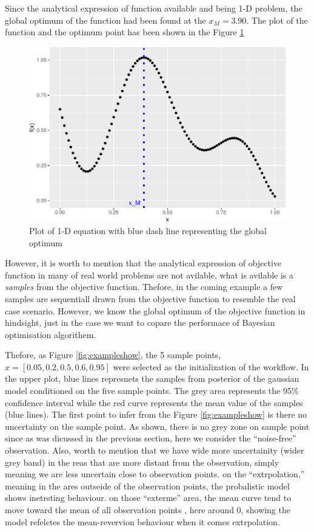 \documentclass[]{elsarticle} %
\begin{document}
Since the analytical expression of function available and being 1-D problem, the global optimum of the function had been found at the \(x_M = 3.90\). The plot of the function and the optimum point has been shown in the Figure \ref{fig:onedplot}

\begin{figure}

{\centering \includegraphics[width=0.9\linewidth]{0_Paper1_main_files/figure-latex/onedplot-1} 

}

\caption{Plot of 1-D equation with blue dash line representing the global optimum}\label{fig:onedplot}
\end{figure}

However, it is worth to mention that the analytical expression of objective function in many of real world problems are not avilable, what is avilable is a \emph{samples} from the objective function. Thefore, in the coming example a few samples are sequentiall drawn from the objective function to resemble the real case scenario. However, we know the global optimum of the objective function in hindsight, just in the case we want to copare the performace of Bayesian optimisation algorithem.

Thefore, as Figure \ref{fig:exampleshow}, the 5 sample points, \(x=[0.05,0.2,0.5,0.6,0.95]\) were selected as the initialization of the workflow. In the upper plot, blue lines represnets the samples from posterior of the gaussian model conditioned on the five sample points. The grey area represents the 95\% confidence interval while the red curve represents the mean value of the samples (blue lines). The first point to infer from the Figure \ref{fig:exampleshow} is there no uncertainty on the sample point. As shown, there is no grey zone on sample point since as was dicussed in the previous section, here we consider the ``noise-free'' observation. Also, worth to mention that we have wide more uncertainity (wider grey band) in the reas that are more distant from the observation, simply meaning we are less uncertain close to observation points. on the ``extrpolation,'' meaning in the ares outseide of the observation points, the probalistic model shows inetrsting behaviour. on those ``exterme'' area, the mean curve tend to move toward the mean of all observation points , here around 0, showing the model refelctes the mean-revervion behaviour when it comes extrpolation.
\end{document}
